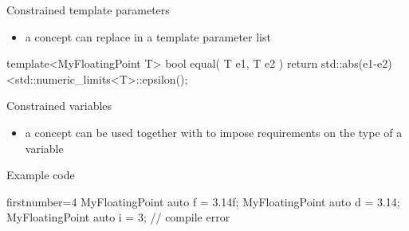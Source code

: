 \begin{frame}[fragile]
    \begin{block}{Constrained template parameters}
      \begin{itemize}
        \item a concept can replace  in a template parameter list
      \end{itemize}
    \end{block}
    \begin{exampleblock}{}
      \small
      \begin{cppcode*}{}
      template<MyFloatingPoint T>
      bool equal( T e1, T e2 ) {
        return std::abs(e1-e2)<std::numeric_limits<T>::epsilon();
      }
      \end{cppcode*}
    \end{exampleblock}
    \begin{block}{Constrained variables}
      \begin{itemize}
        \item a concept can be used together with  to impose requirements on the type of a variable
      \end{itemize}
    \end{block}
    \begin{exampleblock}{Example code}
      \begin{cppcode*}{firstnumber=4}
      MyFloatingPoint auto f = 3.14f;
      MyFloatingPoint auto d = 3.14;
      MyFloatingPoint auto i = 3; // compile error
      \end{cppcode*}
    \end{exampleblock}
\end{frame}


